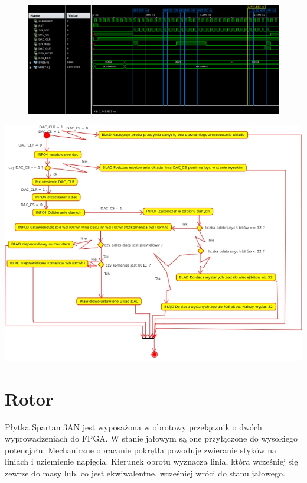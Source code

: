 \documentclass[a4paper,12pt]{article}
\begin{document}
\begin{figure}[htb]
   \centering
   \includegraphics[width=13cm]{grafika/toptest-fastdac-110.png}
\end{figure}


\includegraphics[width=15cm]{grafika/dac-uml.jpg}




\newpage
\section{Rotor}

Płytka Spartan 3AN jest wyposażona w obrotowy przełącznik o dwóch wyprowadzeniach do FPGA. W stanie jałowym są one przyłączone do wysokiego potencjału. Mechaniczne obracanie pokrętła powoduje zwieranie styków na liniach i uziemienie napięcia. Kierunek obrotu wyznacza linia, która wcześniej się zewrze do masy lub, co jest ekwiwalentne, wcześniej wróci do stanu jałowego.
\end{document}

